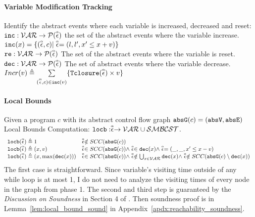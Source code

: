 \paragraph*{Variable Modification Tracking}
Identify the abstract events where each variable is increased, decreased and reset:
\\
$\inc: \mathcal{VAR} \to \mathcal{P}(\absevent) $
the set of the abstract events where the variable increase.
\\
$\inc(x) = \{(\absevent, c) | \absevent = (l, l', x' \leq x + v)\}$
\\
$\reset: \mathcal{VAR} \to \mathcal{P}(\absevent) $
The set of the abstract events where the variable is reset.
\\
$\dec: \mathcal{VAR} \to \mathcal{P}(\absevent) $
The set of abstract events where the variable decrease.
\\
$Incr(v) \triangleq \sum\limits_{(\absevent, c) \in \inc(v)}\{\absclr(\absevent) \times v\}$
%
\paragraph*{Local Bounds}
Given a program $c$ with its abstract control flow graph 
$\absG(c) = (\absV, \absE)$
\\
Local Bounds Computation:
$\locbound: \absevent \to \mathcal{VAR} \cup \constdom$.
%
\[ 
\begin{array}{ll}
  \locbound(\absevent) \triangleq 1 
  & \absevent \notin SCC(\absG(c))
  \\
  \locbound(\absevent) \triangleq (x, v) 
  & \absevent \in SCC(\absG(c)) \land \absevent \in \dec(x) \land  \absevent = (\_, \_ , x' \leq x - v) \\
  \locbound(\absevent) \triangleq (x, \max(\dec(x))) 
  & \absevent \in SCC(\absG(c)) \land 
  \absevent  \notin \bigcup_{x \in \mathcal{VAR}} \dec(x)
  \land \absevent \notin SCC(\absG(c) \setminus \dec(x)) 
\end{array}
  \]
  The first case is straightforward. Since variable's visiting time outside of any while loop is at most 1, I do not need to analyze the visiting times of every node in the graph from phase 1.
  The second and third step is guaranteed by the \emph{Discussion on Soundness} in Section 4 of \cite{sinn2017complexity}.
  Then soundness proof is in Lemma~\ref{lem:local_bound_sound} in Appendix~\ref{apdx:reachability_soundness}.
%
